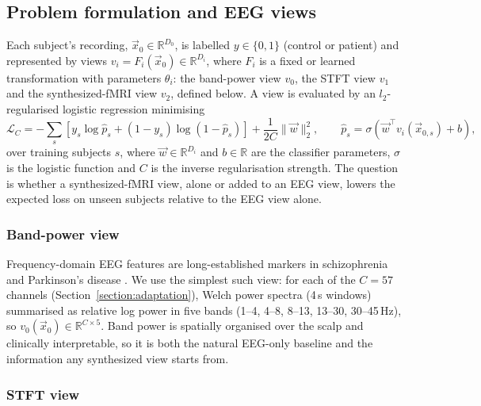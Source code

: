 \documentclass[pdflatex,referee,sn-basic]{sn-jnl}%
\begin{document}
\subsection{Problem formulation and EEG views}\label{section:problem_description}

Each subject's recording, $\vec{x}_0 \in \mathbb{R}^{D_0}$, is labelled $y \in \{0,1\}$ (control or patient) and represented by views $v_i = F_i(\vec{x}_0) \in \mathbb{R}^{D_i}$, where $F_i$ is a fixed or learned transformation with parameters $\theta_i$: the band-power view $v_0$, the STFT view $v_1$ and the synthesized-fMRI view $v_2$, defined below. A view is evaluated by an $l_2$-regularised logistic regression minimising
\begin{equation}\label{equation:loss}
    \mathcal{L}_C = -\sum_{s} \left[ y_s \log \hat{p}_s + (1-y_s) \log(1-\hat{p}_s) \right] + \frac{1}{2C}\|\vec{w}\|_2^2, \qquad \hat{p}_s = \sigma\!\left(\vec{w}^\top v_i(\vec{x}_{0,s}) + b\right),
\end{equation}
over training subjects $s$, where $\vec{w} \in \mathbb{R}^{D_i}$ and $b \in \mathbb{R}$ are the classifier parameters, $\sigma$ is the logistic function and $C$ is the inverse regularisation strength. The question is whether a synthesized-fMRI view, alone or added to an EEG view, lowers the expected loss on unseen subjects relative to the EEG view alone.

\subsubsection{Band-power view}\label{eeg_views:bandpower}

Frequency-domain EEG features are long-established markers in schizophrenia and Parkinson's disease \cite{itil1977qualitative,roach2008event,bates2009low,barros2021advanced}. We use the simplest such view: for each of the $C=57$ channels (Section~\ref{section:adaptation}), Welch power spectra (4\,s windows) summarised as relative log power in five bands (1--4, 4--8, 8--13, 13--30, 30--45\,Hz), so $v_0(\vec{x}_0) \in \mathbb{R}^{C\times5}$. Band power is spatially organised over the scalp and clinically interpretable, so it is both the natural EEG-only baseline and the information any synthesized view starts from.

\subsubsection{STFT view}\label{eeg_views:channel_freq_time}
\end{document}
